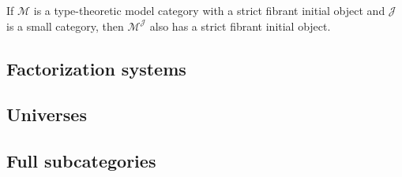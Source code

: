 \documentclass[reqno]{amsart}
\theoremstyle{definition}
\theoremstyle{remark}
\newcommand{\scat}[1]{\mathcal{#1}}
\numberwithin{figure}{section}
\begin{document}
\begin{example}
If $\scat{M}$ is a type-theoretic model category with a strict fibrant initial object and $\scat{J}$ is a small category, then $\scat{M}^\scat{J}$ also has a strict fibrant initial object.
\end{example}

\subsection{Factorization systems}


\subsection{Universes}


\subsection{Full subcategories}




\end{document}
